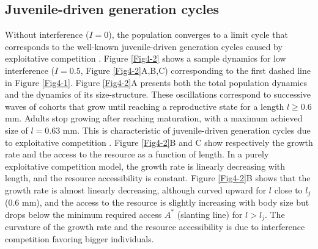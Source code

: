 \subsection{Juvenile-driven generation cycles}

Without interference ($I=0$), the population converges to a limit cycle that
corresponds to the well-known juvenile-driven generation cycles caused by
exploitative competition \autocites{de-roos1992a,de-roos1997a}. Figure
\ref{Fig4-2} shows a sample dynamics for low interference ($I=0.5$, Figure
\ref{Fig4-2}A,B,C) corresponding to the first dashed line in Figure
\ref{Fig4-1}. Figure \ref{Fig4-2}A presents both the total population dynamics
and the dynamics of its size-structure. These oscillations correspond to
successive waves of cohorts that grow until reaching a reproductive state for a
length $l\geq0.6$ mm. Adults stop growing after reaching maturation, with a
maximum achieved size of $l=0.63$ mm. This is characteristic of juvenile-driven
generation cycles due to exploitative competition
\autocites{de-roos1992a,de-roos2003b}. Figure \ref{Fig4-2}B and C show
respectively the growth rate and the access to the resource as a function of
length. In a purely exploitative competition model, the growth rate is linearly
decreasing with length, and the resource accessibility is constant.
Figure \ref{Fig4-2}B shows that the growth rate is almost linearly decreasing,
although curved upward for $l$ close to $l_j$ ($0.6$ mm), and the access to the
resource is slightly increasing with body size but drops below the minimum
required access $A^*$ (slanting line) for $l > l_j$. The curvature of the growth
rate and the resource accessibility is due to interference competition favoring
bigger individuals.

